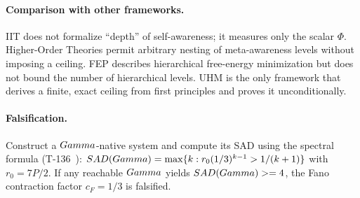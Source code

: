 \paragraph{Comparison with other frameworks.}
IIT does not formalize ``depth'' of self-awareness; it measures only the
scalar $\Phi$.  Higher-Order Theories permit arbitrary nesting of
meta-awareness levels without imposing a ceiling.  FEP describes hierarchical
free-energy minimization but does not bound the number of hierarchical levels.
UHM is the only framework that derives a finite, exact ceiling from first
principles and proves it unconditionally.

\paragraph{Falsification.}
Construct a $Gamma$-native system and compute its SAD using the spectral formula
(T-136~): $SAD(Gamma) = \max\{k : r_0 (1/3)^{k-1} > 1/(k+1)\}$
with $r_0 = 7P/2$. If any reachable $Gamma$ yields $SAD(Gamma) >= 4$,
the Fano contraction factor $c_F = 1/3$ is falsified.
